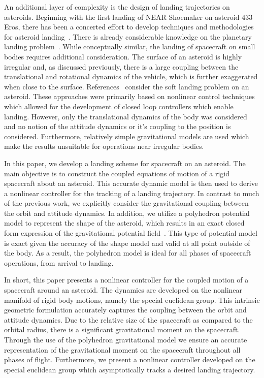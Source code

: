 \documentclass[letterpaper, paper,11pt]{AAS}		%
\begin{document}
An additional layer of complexity is the design of landing trajectories on asteroids.
Beginning with the first landing of NEAR Shoemaker on asteroid 433 Eros, there has been a concerted effort to develop techniques and methodologies for asteroid landing~\cite{dunham2002, kubota2006}.
There is already considerable knowledge on the planetary landing problem~\cite{acikmese2007, meditch1964, ingoldby1978}.
While conceptually similar, the landing of spacecraft on small bodies requires additional consideration. 
The surface of an asteroid is highly irregular and, as discussed previously, there is a large coupling between the translational and rotational dynamics of the vehicle, which is further exaggerated when close to the surface.
References~ consider the soft landing problem on an asteroid.
These approaches were primarily based on nonlinear control techniques which allowed for the development of closed loop controllers which enable landing.
However, only the translational dynamics of the body was considered and no notion of the attitude dynamics or it's coupling to the position is considered.
Furthermore, relatively simple gravitational models are used which make the results unsuitable for operations near irregular bodies.

In this paper, we develop a landing scheme for spacecraft on an asteroid.
The main objective is to construct the coupled equations of motion of a rigid spacecraft about an asteroid.
This accurate dynamic model is then used to derive a nonlinear controller for the tracking of a landing trajectory.
In contrast to much of the previous work, we explicitly consider the gravitational coupling between the orbit and attitude dynamics.
In addition, we utilize a polyhedron potential model to represent the shape of the asteroid, which results in an exact closed form expression of the gravitational potential field~\cite{werner1994,werner1996}.
This type of potential model is exact given the accuracy of the shape model and valid at all point outside of the body. 
As a result, the polyhedron model is ideal for all phases of spacecraft operations, from arrival to landing.

In short, this paper presents a nonlinear controller for the coupled motion of a spacecraft around an asteroid.
The dynamics are developed on the nonlinear manifold of rigid body motions, namely the special euclidean group.
This intrinsic geometric formulation accurately captures the coupling between the orbit and attitude dynamics. 
Due to the relative size of the spacecraft as compared to the orbital radius, there is a significant gravitational moment on the spacecraft. 
Through the use of the polyhedron gravitational model we ensure an accurate representation of the gravitational moment on the spacecraft throughout all phases of flight. 
Furthermore, we present a nonlinear controller developed on the special euclidean group which asymptotically tracks a desired landing trajectory. 
\end{document}
